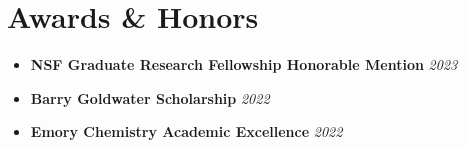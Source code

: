 \documentclass[11pt, letterpaper]{article}
\newcommand{\resumeItem}[1]{\item\small{#1}}
\begin{document}
\section{Awards \& Honors}
\begin{itemize}[leftmargin=0.15in, label={--}, itemsep=-2pt]
    \resumeItem{\textbf{NSF Graduate Research Fellowship Honorable Mention} \hfill \textit{2023}}
    \resumeItem{\textbf{Barry Goldwater Scholarship} \hfill \textit{2022}}
    \resumeItem{\textbf{Emory Chemistry Academic Excellence} \hfill \textit{2022}}
\end{itemize}
\end{document}
